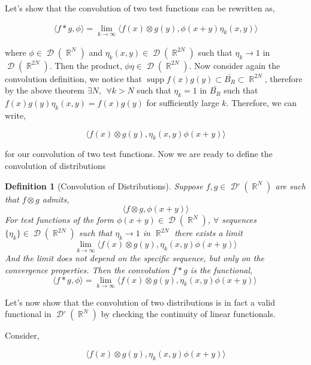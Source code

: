 \documentclass[12pt, a4]{article}
\newtheorem{definition}{Definition}[section]
\DeclareMathOperator\supp{supp}
\DeclareMathOperator\reals{\mathbb{R}}
\DeclareMathOperator\tfspaceD{\mathcal{D}}
\DeclareMathOperator\dist{\mathcal{D'}}
\begin{document}
Let's show that the convolution of two test functions can be rewritten as,

\begin{eqnarray}
    \langle f * g, \phi \rangle = \lim_{k \rightarrow \infty} \langle f(x) \otimes g(y), \phi(x+y)\eta_k(x, y) \rangle
\end{eqnarray}

where $\phi \in \tfspaceD(\reals^N)$ and $\eta_k(x, y) \in \tfspaceD(\reals^{2N})$ such that $\eta_k \rightarrow 1$ in $\tfspaceD(\reals^{2N})$. Then the product, $\phi \eta \in \tfspaceD(\reals^{2N}) $. Now consider again the convolution definition,
we notice that $\supp f(x) g(y) \subset \bar{B_R} \subset \reals^{2N}$, therefore by the above theorem $\exists N, \> \> \forall k > N$ such that $\eta_k = 1$ in $\bar{B_R}$ such that $f(x)g(y)\eta_k(x, y) = f(x)g(y)$ for sufficiently large $k$. Therefore, we can write,

\begin{equation}
    \langle f(x) \otimes g(y), \eta_k(x, y)\phi(x+y) \rangle
\end{equation}

for our convolution of two test functions. Now we are ready to define the convolution of distributions

\begin{definition}[Convolution of Distributions]
    Suppose $f, g \in \dist(\reals^N)$ are such that $f \otimes g$ admits, \[ \langle f \otimes g, \phi(x+y) \rangle \] For test functions of the form $\phi(x+y) \in \tfspaceD(\reals^N)$, $\forall$ sequences $\{\eta_k\} \in \tfspaceD(\reals^{2N})$ such that $\eta_k \rightarrow 1$ in $\reals^{2N}$ there exists a limit \[ \lim_{k\rightarrow \infty} \langle f(x) \otimes g(y), \eta_k(x, y)\phi(x+y) \rangle \] And the limit does not depend on the specific sequence, but only on the convergence properties. Then the convolution $f*g$ is the functional,
    \[ \langle f*g, \phi \rangle =  \lim_{k\rightarrow \infty} \langle f(x) \otimes g(y), \eta_k(x, y)\phi(x+y) \rangle\ \]
\end{definition}

Let's now show that the convolution of two distributions is in fact a valid functional in $\dist(\reals^N)$ by checking the continuity of linear functionals.

Consider,

\begin{equation}
    \langle f(x) \otimes g(y), \eta_k(x, y)\phi(x+y) \rangle
\end{equation}
\end{document}
